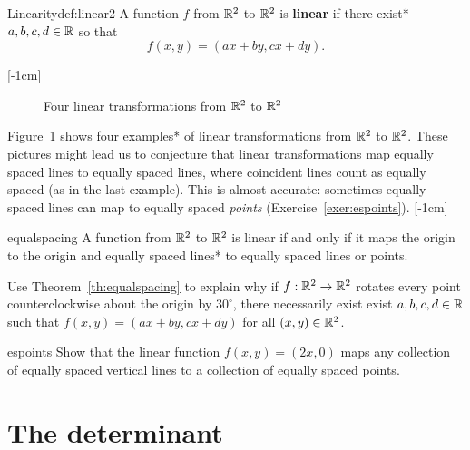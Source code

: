 \documentclass[svgnames]{watsonbook}
\begin{document}
\begin{defn}{Linearity}{def:linear2}
  A function $f$ from $\mathbb{R}^2$ to $\mathbb{R}^2$ is \textbf{linear} if there exist*
  $a,b,c,d \in \mathbb{R}$ so that 
  \[
    f(x,y) = (ax + by , cx + dy). 
  \]
\end{defn}
[-1cm]

\begin{figure}[h!]

\caption{Four linear transformations from $\mathbb{R}^2$ to $\mathbb{R}^2$ \label{fig:four_trans}}
\end{figure}

Figure~\ref{fig:four_trans} shows four examples* of linear
transformations from $\mathbb{R}^2$ to $\mathbb{R}^2$. These pictures might lead us to
conjecture that linear transformations map equally spaced lines to
equally spaced lines, where coincident lines count as equally spaced
(as in the last example). This is almost accurate: sometimes equally
spaced lines can map to equally spaced \textit{points}
(Exercise~\ref{exer:espoints}). [-1cm]

\begin{theo}{}{equalspacing}
  A function from $\mathbb{R}^2$ to $\mathbb{R}^2$ is linear if and only if it maps
  the origin to the origin and equally spaced lines* to equally spaced
  lines or points. 
\end{theo}

\begin{exercise}{}{}
  Use Theorem~\ref{th:equalspacing} to explain why if $f : \mathbb{R}^2 \to
  \mathbb{R}^2$ rotates every point counterclockwise about the origin by $30^\circ$, there
  necessarily exist exist $a,b,c,d\in\mathbb{R}$ such that $f(x,y) = (ax+ by,
  cx+ dy)$ for all $(x,y) \in\mathbb{R}^2$. 
\end{exercise}

\begin{exercise}{}{espoints}
  Show that the linear function $f(x,y)=(2x,0)$ maps any collection of
  equally spaced vertical lines to a collection of equally spaced points.
\end{exercise}

\section{The determinant} \label{sec:det} 
\end{document}
